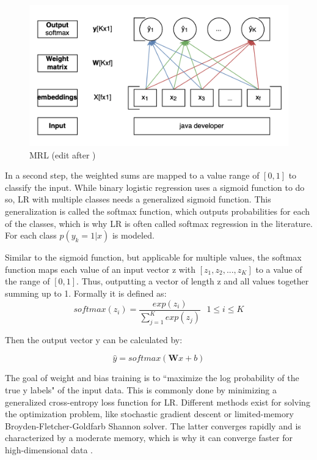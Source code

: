 \documentclass[12pt, a4paper, titlepage]{article}
\begin{document}
\begin{figure}[hb!]
  \center
  \includegraphics[scale=0.5]{LR.png}
  \caption[LR]{\label{fig: F7} MRL (edit after \citep[p.]{jurafsky2021})}
\end{figure}

In a second step, the weighted sums are mapped to a value range of $[0,1]$ to classify the input. While binary logistic regression uses a sigmoid function to do so, \ac{LR} with multiple classes needs a generalized sigmoid function. This generalization is called the softmax function, which outputs probabilities for each of the classes, which is why \ac{LR} is often called softmax regression in the literature. For each class $p(y_k = 1|x)$ is modeled. 

Similar to the sigmoid function, but applicable for multiple values, the softmax function maps each value of an input vector z with $[z_1, z_2, ..., z_K]$ to a value of the range of $[0,1]$. Thus, outputting a vector of length z and all values together summing up to 1. Formally it is defined as: 
\[ softmax(z_i) = \frac{exp(z_i)}{\sum^K_{j=1} exp(z_j)} \text{ } 1 \leq i \leq K \]

Then the output vector y can be calculated by: 

\[ \hat{y} = softmax(\textbf{W}x+b) \]

The goal of weight and bias training is to ``maximize the log probability of the true y labels" of the input data. This is commonly done by minimizing a generalized cross-entropy loss function for \ac{LR}. Different methods exist for solving the optimization problem, like stochastic gradient descent or limited-memory Broyden-Fletcher-Goldfarb Shannon solver. The latter converges rapidly and is characterized by a moderate memory, which is why it can converge faster for high-dimensional data \citep{fei2014, scikit-learn}. 
\end{document}
